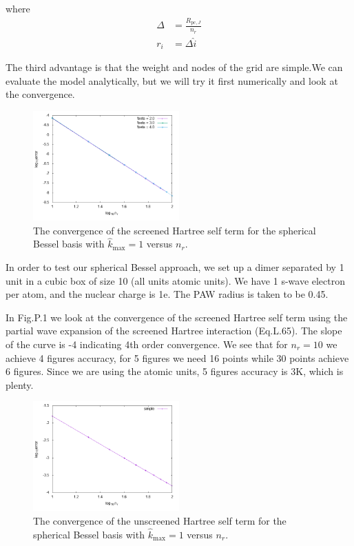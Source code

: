 \documentclass[paper=a4, fontsize=11pt]{article} %
\numberwithin{equation}{section} %
\numberwithin{figure}{section} %
\numberwithin{table}{section} %
\begin{document}
where
\begin{equation}
\begin{split}
\Delta &= \frac{R_{\mathrm{pc},J}}{n_r} \\
r_i &= \Delta \hat {i}
\end{split}
\end{equation}

The third advantage is that the weight and nodes of the grid are simple.We can evaluate the model analytically, but we will try it first numerically and look at the convergence. 
\newpage

\begin{figure} [h!]
    \centering
    \includegraphics[width=0.5\textwidth]{sBesselerror}
    \caption{The convergence of the screened Hartree self term for the spherical Bessel basis with $\hat {k}_{\mathrm{max}} = 1$ versus $n_r$.} 
    \label{fig:sBesselerror}
\end{figure}

In order to test our spherical Bessel approach, we set up a dimer separated by 1 unit in a cubic box of size 10 (all units atomic units). We have 1 s-wave electron per atom, and the nuclear charge is 1e. The PAW radius is taken to be 0.45.

In Fig.P.1 we look at the convergence of the screened Hartree self term using the partial wave expansion of the screened Hartree interaction (Eq.L.65). The slope of the curve is -4 indicating 4th order convergence. We see that for $n_r = 10$ we achieve 4 figures accuracy, for 5 figures we need 16 points while 30 points achieve 6 figures. Since we are using the atomic units, 5 figures accuracy is 3K, which is plenty.

\begin{figure}[h!] 
    \centering
    \includegraphics[width=0.5\textwidth]{sBesselerrorsimple}
    \caption{The convergence of the unscreened Hartree self term for the spherical Bessel basis with $\hat {k}_{\mathrm{max}} = 1$ versus $n_r$.} 
    \label{fig:sBesselerrorsimple}
\end{figure}
\end{document}
